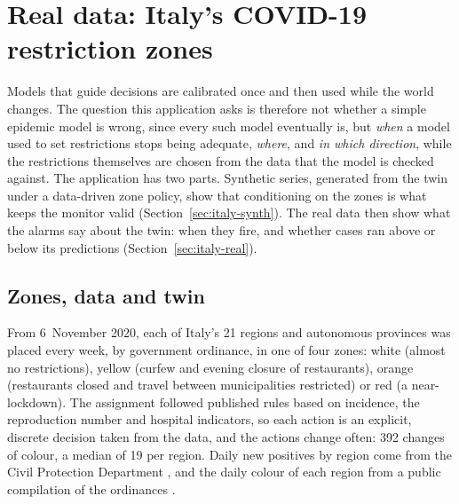 
\section{Real data: Italy's COVID-19 restriction zones}\label{sec:italy-regions}

Models that guide decisions are calibrated once and then used while the world
changes. The question this application asks is therefore not whether a simple
epidemic model is wrong, since every such model eventually is, but \emph{when}
a model used to set restrictions stops being adequate, \emph{where}, and
\emph{in which direction}, while the restrictions themselves are chosen from the
data that the model is checked against. The application has two parts.
Synthetic series, generated from the twin under a data-driven zone policy,
show that conditioning on the zones is what keeps the monitor valid
(Section~\ref{sec:italy-synth}). The real data then show what the alarms say about the twin: when
they fire, and whether cases ran above or below its predictions
(Section~\ref{sec:italy-real}).

\subsection{Zones, data and twin}\label{sec:italy}

From 6~November 2020, each of Italy's 21 regions and autonomous provinces was
placed every week, by government ordinance, in one of four zones: white (almost
no restrictions), yellow (curfew and evening closure of restaurants), orange
(restaurants closed and travel between municipalities restricted) or red (a
near-lockdown). The assignment followed published rules based on incidence,
the reproduction number and hospital indicators, so each action is an
explicit, discrete decision taken from the data, and the actions change often:
392 changes of colour, a median of 19 per region. Daily new positives by region
come from the Civil Protection Department \citep{dpc2020covid}, and the daily
colour of each region from a public compilation of the ordinances
\citep{imcatta2022restrizioni}.

